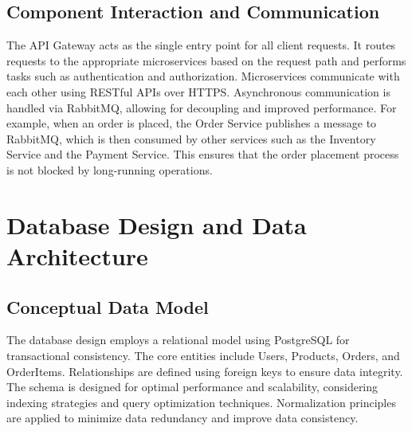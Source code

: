 \documentclass[11pt,a4paper,oneside]{article}
\begin{document}
\subsection{Component Interaction and Communication}

The API Gateway acts as the single entry point for all client requests.  It routes requests to the appropriate microservices based on the request path and performs tasks such as authentication and authorization.  Microservices communicate with each other using RESTful APIs over HTTPS.  Asynchronous communication is handled via RabbitMQ, allowing for decoupling and improved performance.  For example, when an order is placed, the Order Service publishes a message to RabbitMQ, which is then consumed by other services such as the Inventory Service and the Payment Service.  This ensures that the order placement process is not blocked by long-running operations.

\section{Database Design and Data Architecture}

\subsection{Conceptual Data Model}

The database design employs a relational model using PostgreSQL for transactional consistency. The core entities include Users, Products, Orders, and OrderItems.  Relationships are defined using foreign keys to ensure data integrity.  The schema is designed for optimal performance and scalability, considering indexing strategies and query optimization techniques.  Normalization principles are applied to minimize data redundancy and improve data consistency.
\end{document}
